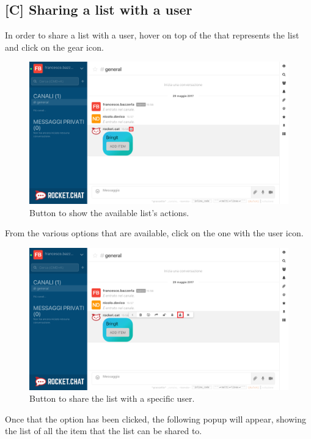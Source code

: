 \newpage
\subsection{[C] Sharing a list with a user}
In order to share a list with a user, hover on top of the  that represents the list and click on the gear icon.

\begin{figure}[H]
  \centering 
  \includegraphics[width=\textwidth]{Sections/3-HowToUse/Images/bubble_options_button.png}
  \caption{Button to show the available list's actions.}
\end{figure}

From the various options that are available, click on the one with the user icon.

\begin{figure}[H]
  \centering 
  \includegraphics[width=\textwidth]{Sections/3-HowToUse/Images/bubble_option_share_user.png}
  \caption{Button to share the list with a specific user.}
\end{figure}

Once that the option has been clicked, the following popup will appear, showing the list of all the item that the list can be shared to.

